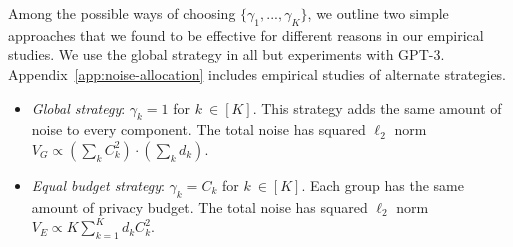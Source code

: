 Among the possible ways of choosing $\{\gamma_1, ..., \gamma_K\}$, we outline two simple approaches that we found to be effective for different reasons in our empirical studies. We use the global strategy in all but experiments with GPT-3.
Appendix~\ref{app:noise-allocation} includes empirical studies of alternate strategies.
\begin{itemize}[leftmargin=6mm,noitemsep]
    \item \emph{Global strategy}: $\gamma_k = 1$ for $k\ \in [K]$. This strategy adds the same amount of noise to every component.  The total noise has squared $\ell_2$ norm $V_{G}\propto(\sum_{k}C_k^{2})\cdot(\sum_{k}d_{k})$.

    \item \emph{Equal budget strategy}: $\gamma_k = C_k$ for $k\ \in [K]$. Each group has the same amount of privacy budget.  The total noise has squared $\ell_2$ norm $V_{E}\propto K\sum_{k=1}^{K}d_{k}C_k^{2}$.
\end{itemize}




